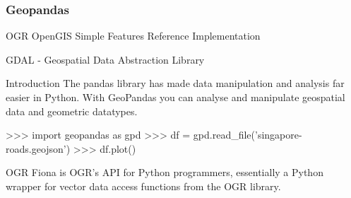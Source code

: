 
\begin{frame}
\frametitle{Geopandas}


OGR	
OpenGIS Simple Features Reference Implementation


GDAL - Geospatial Data Abstraction Library


Introduction
The pandas library has made data manipulation and analysis far easier in Python. 
With GeoPandas you can analyse and manipulate geospatial data and geometric datatypes.



>>> import geopandas as gpd
>>> df = gpd.read_file('singapore-roads.geojson')
>>> df.plot()


OGR
Fiona is OGR's API for Python programmers, essentially a Python wrapper for vector data access functions from the OGR library.
\end{frame}
